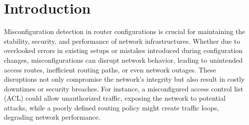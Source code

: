 
\section{Introduction}
\label{sec:intro}

Misconfiguration detection in router configurations is crucial for maintaining the stability, security, and performance of network infrastructures. Whether due to overlooked errors in existing setups or mistakes introduced during configuration changes, misconfigurations can disrupt network behavior, leading to unintended access routes, inefficient routing paths, or even network outages. These disruptions not only compromise the network’s integrity but also result in costly downtimes or security breaches. For instance, a misconfigured access control list (ACL) could allow unauthorized traffic, exposing the network to potential attacks, while a poorly defined routing policy might create traffic loops, degrading network performance.

